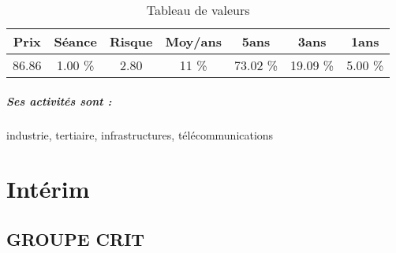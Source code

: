 \documentclass[11pt,a4paper]{report}%
\begin{document}
\begin{table}[H]
  \centering
    \begin{tabular}{|c|c|c|c|c|c|c|}
    \hline
    Prix & Séance & Risque  & Moy/ans & 5ans & 3ans & 1ans \\
    \hline
    86.86 &    1.00 \%    & 2.80 & 11 \% & 73.02 \% & 19.09 \% & 5.00 \% \\
    \hline
    \end{tabular}%
        \label{tab:table_VINCI}%
      \caption{Tableau de valeurs}
\end{table}%

\paragraph{Ses activités sont : } industrie, tertiaire, infrastructures, télécommunications  
    
    \newpage\chapter{Intérim}


\section{GROUPE CRIT}
\end{document}
